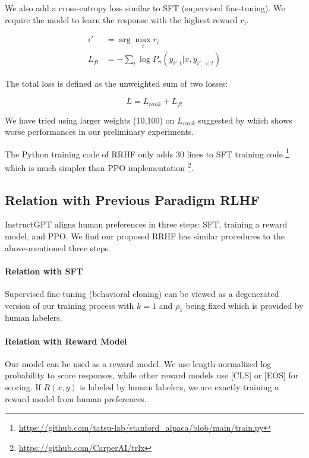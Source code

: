We also add a cross-entropy loss similar to SFT (supervised fine-tuning). We require the model to learn the response with the highest reward $r_i$.

\begin{align}
    i' &= \arg\max_i{r_i} \\
    L_{ft} &= -\sum_t \log P_\pi(y_{i',t}|x,y_{i',<t})
\end{align}

The total loss is defined as the unweighted sum of two losses:

\begin{equation}
    L = L_{rank} + L_{ft}
\end{equation}

We have tried using larger weights (10,100) on $L_{rank}$ suggested by \citet{liu-etal-2022-brio} which shows worse performances in our preliminary experiments. 

The Python training code of RRHF only adds 30 lines to SFT training code \footnote{\url{https://github.com/tatsu-lab/stanford_alpaca/blob/main/train.py}} which is much simpler than PPO implementation \footnote{\url{https://github.com/CarperAI/trlx}}.

\subsection{Relation with Previous Paradigm RLHF} InstructGPT \cite{instructgpt} aligns human preferences in three steps: SFT, training a reward model, and PPO. We find our proposed RRHF has similar procedures to the above-mentioned three steps.

\paragraph{Relation with SFT}

Supervised fine-tuning (behavioral cloning) can be viewed as a degenerated version of our training process with $k=1$ and $\rho_1$ being fixed which is provided by human labelers.

\paragraph{Relation with Reward Model}

Our model can be used as a reward model. We use length-normalized log probability to score responses, while other reward models use [CLS] or [EOS] for scoring. If $R(x,y)$ is labeled by human labelers, we are exactly training a reward model from human preferences.

